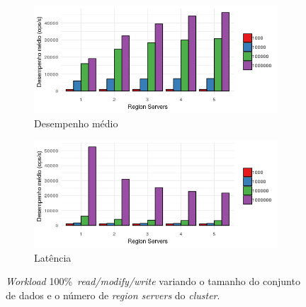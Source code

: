 \documentclass[12pt]{article}
\begin{document}
\begin{figure}[!ht]
    \centering
    \begin{subfigure}[b]{0.49\textwidth}
        \centering
        \includegraphics[width=\textwidth]{images/figura19}
        \caption{Desempenho médio}
        \label{figura19}
    \end{subfigure}
        \hfill
    \begin{subfigure}[b]{0.49\textwidth}  
        \centering 
        \includegraphics[width=\textwidth]{images/figura20}
        \caption{Latência}%
        \label{figura20}
    \end{subfigure}
    \caption{\emph{Workload} 100\%~\emph{read/modify/write} variando o tamanho do conjunto de dados e o número de \emph{region servers} do \emph{cluster}.}
\end{figure}
\end{document}
